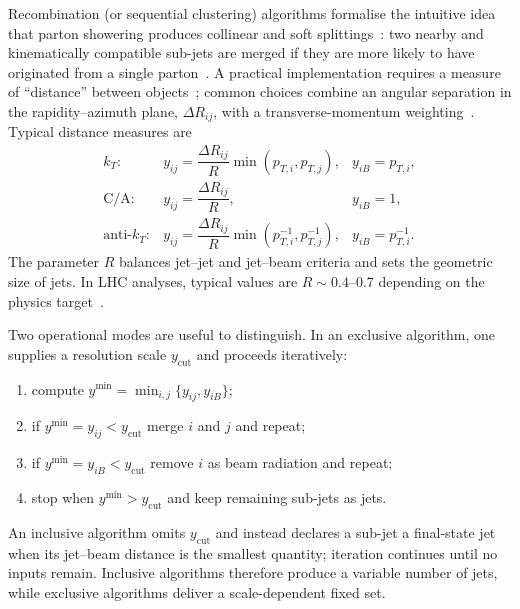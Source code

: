 Recombination (or sequential clustering) algorithms formalise the intuitive idea that parton showering produces collinear and soft splittings~\cite{Catani:1993,Dokshitzer:1997,Salam:2010}: two nearby and kinematically compatible sub-jets are merged if they are more likely to have originated from a single parton~\cite{Catani:1993,Dokshitzer:1997}. A practical implementation requires a measure of ``distance'' between objects~\cite{Catani:1993,Cacciari:2011ma}; common choices combine an angular separation in the rapidity–azimuth plane, $\Delta R_{ij}$, with a transverse-momentum weighting~\cite{Catani:1993,Cacciari:2008gp}. Typical distance measures are~\cite{Catani:1993,Dokshitzer:1997,Cacciari:2008gp}
\begin{equation}
  \begin{array}{lll}
  k_T: & y_{ij}=\dfrac{\Delta R_{ij}}{R}\min(p_{T,i},p_{T,j}), & y_{iB}=p_{T,i},\\[6pt]
  \mathrm{C/A}: & y_{ij}=\dfrac{\Delta R_{ij}}{R}, & y_{iB}=1,\\[6pt]
  \text{anti-}k_T: & y_{ij}=\dfrac{\Delta R_{ij}}{R}\min(p_{T,i}^{-1},p_{T,j}^{-1}), & y_{iB}=p_{T,i}^{-1}.
  \end{array}  
\end{equation}
The parameter $R$ balances jet–jet and jet–beam criteria and sets the geometric size of jets. In LHC analyses, typical values are $R\sim0.4\text{--}0.7$ depending on the physics target~\cite{Cacciari:2011ma}.

Two operational modes are useful to distinguish. In an exclusive algorithm, one supplies a resolution scale $y_{\text{cut}}$ and proceeds iteratively:
\begin{enumerate}
  \item compute $y^{\min}=\min_{i,j}\{y_{ij},y_{iB}\}$;
  \item if $y^{\min}=y_{ij}<y_{\text{cut}}$ merge $i$ and $j$ and repeat;
  \item if $y^{\min}=y_{iB}<y_{\text{cut}}$ remove $i$ as beam radiation and repeat;
  \item stop when $y^{\min}>y_{\text{cut}}$ and keep remaining sub-jets as jets.
\end{enumerate}
An inclusive algorithm omits $y_{\text{cut}}$ and instead declares a sub-jet a final-state jet when its jet–beam distance is the smallest quantity; iteration continues until no inputs remain. Inclusive algorithms therefore produce a variable number of jets, while exclusive algorithms deliver a scale-dependent fixed set.

